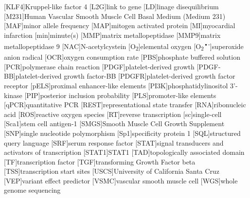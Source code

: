 \begin{acronym}[PDGF-BB]
[KLF4]{Kruppel-like factor 4}
[L2G]{link to gene}
[LD]{linage disequilibrium}
[M231]{Human Vascular Smooth Muscle Cell Basal Medium (Medium 231)}
[MAF]{minor allele frequency}
[MAP]{mitogen activated protein}
[MI]{myocardial infarction}
[min]{minute(s)}
[MMP]{matrix metallopeptidase}
[MMP9]{matrix metallopeptidase 9}
[NAC]{N-acetylcystein}
[O\textsubscript{2}]{elemental oxygen}
[O\textsubscript{2}\textsuperscript{•-}]{superoxide anion radical}
[OCR]{oxygen consumption rate}
[PBS]{phosphate buffered solution}
[PCR]{polymerase chain reaction}
[PDGF]{platelet-derived growth}
[PDGF-BB]{platelet-derived growth factor-BB}
[PDGFR]{platelet-derived growth factor receptor}
[pELS]{proximal enhancer-like elements}
[PI3K]{phosphatidylinositol 3'-kinase}
[PIP]{posterior inclusion probability}
[PLS]{promoter-like elements}
[qPCR]{quantitative PCR}
[REST]{representational state transfer}
[RNA]{ribonucleic acid}
[ROS]{reactive oxygen species}
[RT]{reverse transcription}
[sc]{single-cell}
[Sca1]{stem cell antigen-1}
[SMGS]{Smooth Muscle Cell Growth Supplement}
[SNP]{single nucleotide polymorphism}
[Sp1]{specificity protein 1}
[SQL]{structured query language}
[SRF]{serum response factor}
[STAT]{signal transducers and activators of transcription}
[STAT1]{STAT1}
[TAD]{topologically associated domain}
[TF]{transcription factor}
[TGF\beta]{transforming Growth Factor beta}
[TSS]{transcription start sites}
[USCS]{University of California Santa Cruz}
[VEP]{variant effect predictor}
[VSMC]{vascular smooth muscle cell}
[WGS]{whole genome sequencing}
\end{acronym}
